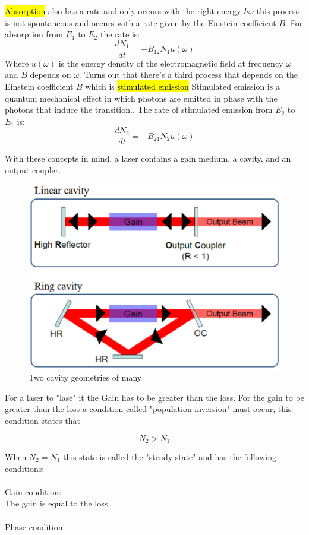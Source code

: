 \documentclass{article}
\begin{document}
\hl{Absorption} also has a rate and only occurs with the right energy $\hbar\omega$ this process is not spontaneous and occurs with a rate given by the Einstein coefficient $B$. For absorption from $E_1$ to $E_2$ the rate is:
\begin{equation}
	\frac{dN_1}{dt} = -B_{12}N_1 u(\omega)
\end{equation}
Where $u(\omega)$ is the energy density of the electromagnetic field at frequency $\omega$ and $B$ depends on $\omega$.
Turns out that there's a third process that depends on the Einstein coefficient $B$ which is \hl{stimulated emission}
Stimulated emission is a quantum mechanical effect in which photons are emitted in phase with the photons that induce the transition.\cite{foxqmoptics}. The rate of stimulated emission from $E_2$ to $E_1$ is:
\begin{equation}
	\frac{dN_2}{dt} = -B_{21}N_2 u(\omega)
\end{equation}

With these concepts in mind, a laser contains a gain medium, a cavity, and an output coupler.
\begin{figure}[!phbt]
    \centering
    \includegraphics[width=0.65\linewidth]{img/cavity_geometries.eps}
    \caption{Two cavity geometries of many}
    \label{fig:absorption}
\end{figure}

For a laser to "lase" it the Gain has to be greater than the loss.
For the gain to be greater than the loss a condition called "population inversion" must occur, this condition states that

\begin{equation}
	N_2 > N_1
\end{equation}

When $N_2 = N_1$ this state is called the "steady state" and has the following conditions:
\\
\
\\
Gain condition:\\
	The gain is equal to the loss
\\
\
\\
Phase condition:\\
\end{document}
